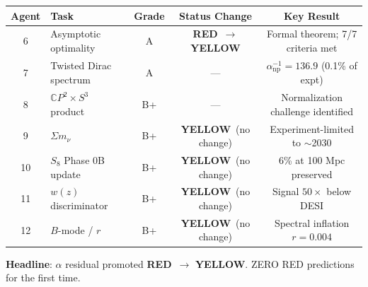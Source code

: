 \documentclass[11pt,a4paper]{article}
\newcommand{\YELLOW}{\textcolor{dfdyellow}{\textbf{YELLOW}}}
\newcommand{\RED}{\textcolor{dfdred}{\textbf{RED}}}
\newcommand{\CP}{\mathbb{C}P}
\begin{document}
\begin{center}
\begin{tabular}{clccc}
\toprule
\textbf{Agent} & \textbf{Task} & \textbf{Grade} & \textbf{Status Change} & \textbf{Key Result} \\
\midrule
6 & Asymptotic optimality & A & \RED\ $\to$ \YELLOW & Formal theorem; 7/7 criteria met \\
7 & Twisted Dirac spectrum & A & --- & $\alpha^{-1}_{\mathrm{np}} = 136.9$ (0.1\% of expt) \\
8 & $\CP^2 \times S^3$ product & B+ & --- & Normalization challenge identified \\
9 & $\Sigma m_\nu$ & B+ & \YELLOW\ (no change) & Experiment-limited to $\sim$2030 \\
10 & $S_8$ Phase 0B update & B+ & \YELLOW\ (no change) & 6\% at 100 Mpc preserved \\
11 & $w(z)$ discriminator & B+ & \YELLOW\ (no change) & Signal $50\times$ below DESI \\
12 & $B$-mode / $r$ & B+ & \YELLOW\ (no change) & Spectral inflation $r = 0.004$ \\
\bottomrule
\end{tabular}
\end{center}

\textbf{Headline}: $\alpha$ residual promoted \RED\ $\to$ \YELLOW. ZERO RED predictions for the first time.
\end{document}
